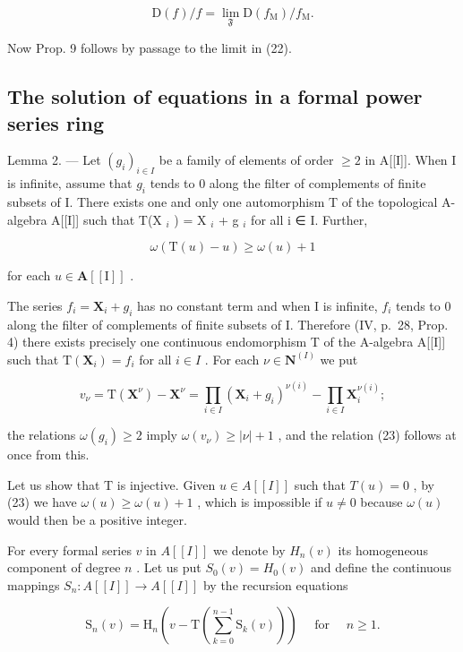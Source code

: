 \[
\mathrm{D} (f) / f = \lim _ {\mathfrak {F}} \mathrm{D} (f _ {\mathrm{M}}) / f _ {\mathrm{M}}.
\]

Now Prop. 9 follows by passage to the limit in (22).

\subsection{The solution of equations in a formal power series ring}

Lemma 2. --- Let \((g_i)_{i \in I}\) be a family of elements of order \(\geqslant 2\) in A{[}{[}I{]}{]}. When I is infinite, assume that \(g_i\) tends to 0 along the filter of complements of finite subsets of I. There exists one and only one automorphism T of the topological A-algebra A{[}{[}I{]}{]} such that T(X \(_i\) ) = X \(_i\) + g \(_i\) for all i ∈ I. Further,

\[
\omega (\mathrm{T} (u) - u) \geqslant \omega (u) + 1\tag{23}
\]

for each \(u \in \mathbf{A}[[\mathrm{I}]]\) .

The series \(f_{i} = \mathbf{X}_{i} + g_{i}\) has no constant term and when I is infinite, \(f_{i}\) tends to 0 along the filter of complements of finite subsets of I. Therefore (IV, p.~28, Prop. 4) there exists precisely one continuous endomorphism T of the A-algebra A{[}{[}I{]}{]} such that \(\mathrm{T}(\mathbf{X}_i) = f_i\) for all \(i \in I\) . For each \(\nu \in \mathbf{N}^{(I)}\) we put

\[
v _ {\nu} = \mathrm{T} \left(\mathbf {X} ^ {\nu}\right) - \mathbf {X} ^ {\nu} = \prod_ {i \in I} \left(\mathbf {X} _ {i} + g _ {i}\right) ^ {\nu (i)} - \prod_ {i \in I} \mathbf {X} _ {i} ^ {\nu (i)};
\]

the relations \(\omega(g_i) \geqslant 2\) imply \(\omega(v_\nu) \geqslant |\nu| + 1\) , and the relation (23) follows at once from this.

Let us show that T is injective. Given \(u \in A[[I]]\) such that \(T(u) = 0\) , by (23) we have \(\omega(u) \geqslant \omega(u) + 1\) , which is impossible if \(u \neq 0\) because \(\omega(u)\) would then be a positive integer.

For every formal series \(v\) in \(A[[I]]\) we denote by \(H_n(v)\) its homogeneous component of degree \(n\) . Let us put \(S_0(v) = H_0(v)\) and define the continuous mappings \(S_n: A[[I]] \to A[[I]]\) by the recursion equations

\[
\mathrm{S} _ {n} (v) = \mathrm{H} _ {n} \left(v - \mathrm{T} \left(\sum_ {k = 0} ^ {n - 1} \mathrm{S} _ {k} (v)\right)\right) \quad \text { for } \quad n \geqslant 1.\tag{24}
\]

